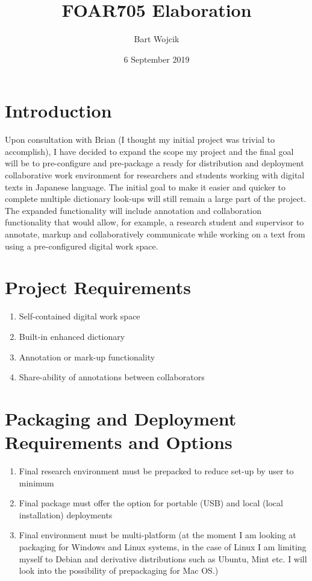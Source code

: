 \documentclass{article}
\title{FOAR705 Elaboration}
\author{Bart Wojcik}
\date{6 September 2019}
\begin{document}
\maketitle

\section{Introduction}
Upon consultation with Brian (I thought my initial project was trivial to accomplish), I have decided to expand the scope my project and the final goal will be to pre-configure and pre-package a ready for distribution and deployment collaborative work environment for researchers and students working with digital texts in Japanese language. The initial goal to make it easier and quicker to complete multiple dictionary look-ups will still remain a large part of the project. The expanded functionality will include annotation and collaboration functionality that would allow, for example, a research student and supervisor to annotate, markup and collaboratively communicate while working on a text from using a pre-configured digital work space.

\section{Project Requirements}
\begin{enumerate}
    \item Self-contained digital work space
    \item Built-in enhanced dictionary
    \item Annotation or mark-up functionality
    \item Share-ability of annotations between collaborators
\end{enumerate}
\section{Packaging and Deployment Requirements and Options}
\begin{enumerate}
    \item Final research environment must be prepacked to reduce set-up by user to minimum
    \item Final package must offer the option for portable (USB) and local (local installation) deployments
    \item Final environment must be multi-platform (at the moment I am looking at packaging for Windows and Linux systems, in the case of Linux I am limiting myself to Debian and derivative distributions such as Ubuntu, Mint etc. I will look into the possibility of prepackaging for Mac OS.)
\end{enumerate}
\end{document}
